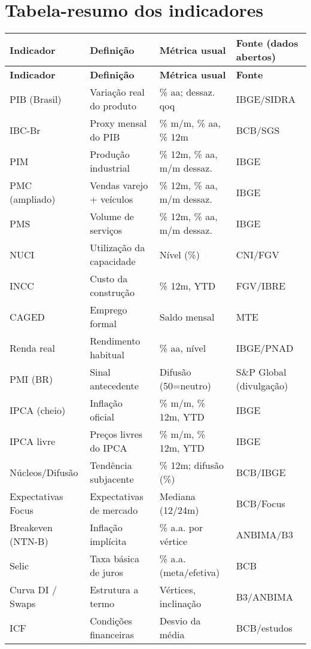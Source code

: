 \documentclass[11pt,a4paper]{article}
\begin{document}
\section{Tabela-resumo dos indicadores}
\footnotesize
\setlength{\tabcolsep}{4pt}
\renewcommand{\arraystretch}{1.2}
\begin{longtable}{p{4.1cm} p{6.8cm} p{3.2cm} p{3.6cm}}
\toprule
\textbf{Indicador} & \textbf{Definição} & \textbf{Métrica usual} & \textbf{Fonte (dados abertos)}\\
\midrule
\endfirsthead
\toprule
\textbf{Indicador} & \textbf{Definição} & \textbf{Métrica usual} & \textbf{Fonte}\\
\midrule
\endhead
PIB (Brasil) & Variação real do produto & \% aa; dessaz. qoq & IBGE/SIDRA \\
IBC-Br & Proxy mensal do PIB & \% m/m, \% aa, \% 12m & BCB/SGS \\
PIM & Produção industrial & \% 12m, \% aa, m/m dessaz. & IBGE \\
PMC (ampliado) & Vendas varejo + veículos & \% 12m, \% aa, m/m dessaz. & IBGE \\
PMS & Volume de serviços & \% 12m, \% aa, m/m dessaz. & IBGE \\
NUCI & Utilização da capacidade & Nível (\%) & CNI/FGV \\
INCC & Custo da construção & \% 12m, YTD & FGV/IBRE \\
CAGED & Emprego formal & Saldo mensal & MTE \\
Renda real & Rendimento habitual & \% aa, nível & IBGE/PNAD \\
PMI (BR) & Sinal antecedente & Difusão (50=neutro) & S\&P Global (divulgação) \\
IPCA (cheio) & Inflação oficial & \% m/m, \% 12m, YTD & IBGE \\
IPCA livre & Preços livres do IPCA & \% m/m, \% 12m, YTD & IBGE \\
Núcleos/Difusão & Tendência subjacente & \% 12m; difusão (\%) & BCB/IBGE \\
Expectativas Focus & Expectativas de mercado & Mediana (12/24m) & BCB/Focus \\
Breakeven (NTN-B) & Inflação implícita & \% a.a. por vértice & ANBIMA/B3 \\
Selic & Taxa básica de juros & \% a.a. (meta/efetiva) & BCB \\
Curva DI / Swaps & Estrutura a termo & Vértices, inclinação & B3/ANBIMA \\
ICF & Condições financeiras & Desvio da média & BCB/estudos \\

\end{longtable}
\end{document}
